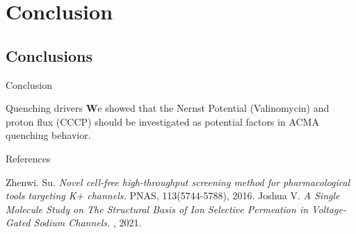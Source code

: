 \documentclass[10pt]{beamer}
\begin{document}
\section{Conclusion}

\subsection{Conclusions}
 \begin{frame}{Conclusion}
        \begin{block}{Quenching drivers}
            \textbf<2> We showed that the Nernst Potential (Valinomycin) and proton flux (CCCP) should be investigated as potential factors in ACMA quenching behavior. 
        \end{block}
        \pause
        \pause
    \end{frame}
    


\appendix

\begin{frame}[standout]{References}

\begin{thebibliography}{1}
 Zhenwi. Su. {\em Novel cell-free high-throughput screening method for pharmacological tools targeting K+ channels.}\/ PNAS,
113(5744-5788), 2016.
 Joshua V. {\em A Single Molecule Study on The Structural Basis of Ion Selective Permeation in Voltage-Gated Sodium Channels.}\/ , 2021.
\end{thebibliography}

\end{frame}
\end{document}
